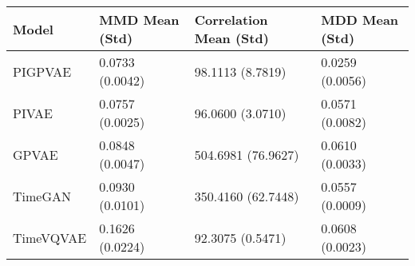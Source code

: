 \begin{tabular}{llll}
\toprule
Model & MMD Mean (Std) & Correlation Mean (Std) & MDD Mean (Std) \\
\midrule
PIGPVAE & 0.0733 (0.0042) & 98.1113 (8.7819) & 0.0259 (0.0056) \\
PIVAE & 0.0757 (0.0025) & 96.0600 (3.0710) & 0.0571 (0.0082) \\
GPVAE & 0.0848 (0.0047) & 504.6981 (76.9627) & 0.0610 (0.0033) \\
TimeGAN & 0.0930 (0.0101) & 350.4160 (62.7448) & 0.0557 (0.0009) \\
TimeVQVAE & 0.1626 (0.0224) & 92.3075 (0.5471) & 0.0608 (0.0023) \\
\bottomrule
\end{tabular}
